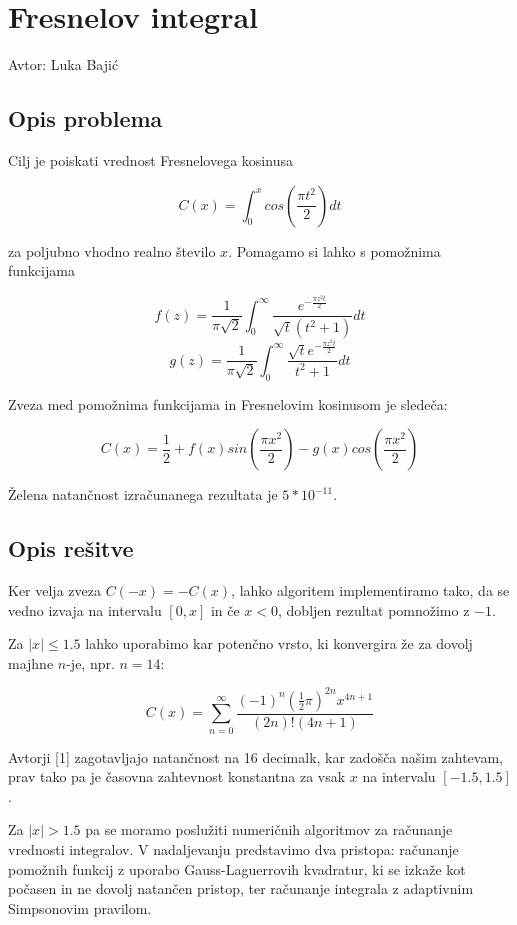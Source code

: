 \documentclass[12pt,a4paper]{article}
\begin{document}
\section{Fresnelov integral}
Avtor: Luka Bajić


\subsection{Opis problema}

Cilj je poiskati vrednost Fresnelovega kosinusa


\[
C(x)=\int_0^xcos(\frac{\pi t^2}{2})dt
\]

za poljubno vhodno realno število $x$. Pomagamo si lahko s pomožnima funkcijama


\[
f(z)=\frac{1}{\pi\sqrt{2}}\int_0^{\infty}\frac{e^{-\frac{\pi z^2t}{2}}}{\sqrt{t}(t^2+1)}dt
\]
\[
g(z)=\frac{1}{\pi\sqrt{2}}\int_0^{\infty}\frac{\sqrt{t}e^{-\frac{\pi z^2t}{2}}}{t^2+1}dt
\]

Zveza med pomožnima funkcijama in Fresnelovim kosinusom je sledeča:


\[
C(x)=\frac{1}{2}+f(x)sin(\frac{\pi x^2}{2}) - g(x)cos(\frac{\pi x^2}{2})
\]

Želena natančnost izračunanega rezultata je $5*10^{-11}$.


\subsection{Opis rešitve}

Ker velja zveza $C(-x) = -C(x)$, lahko algoritem implementiramo tako, da se vedno izvaja na intervalu $[0, x]$ in če $x<0$, dobljen rezultat pomnožimo z $-1$.


Za $|x|\leq1.5$ lahko uporabimo kar potenčno vrsto, ki konvergira že za dovolj majhne $n$-je,  npr. $n=14$:


\[
C(x)=\sum_{n=0}^{\infty}\frac{(-1)^n(\frac{1}{2}\pi)^{2n}x^{4n+1}}{(2n)!(4n+1)}
\]

Avtorji [1] zagotavljajo natančnost na 16 decimalk, kar zadošča našim zahtevam, prav tako pa je časovna zahtevnost konstantna za vsak $x$ na intervalu $[-1.5, 1.5]$.


Za $|x|>1.5$ pa se moramo poslužiti numeričnih algoritmov za računanje vrednosti integralov. V nadaljevanju predstavimo dva pristopa: računanje pomožnih funkcij z uporabo Gauss-Laguerrovih kvadratur, ki se izkaže kot počasen in ne dovolj natančen pristop, ter računanje integrala z  adaptivnim Simpsonovim pravilom.
\end{document}
